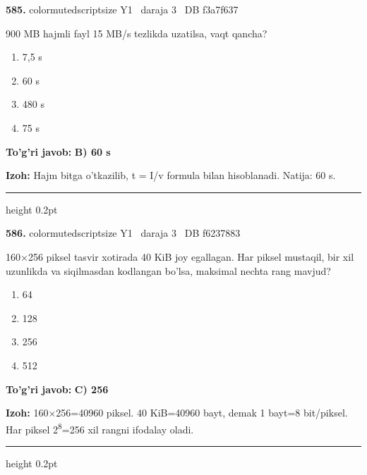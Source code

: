 \documentclass[10pt,a4paper,oneside]{article}
\begin{document}
\noindent\textbf{\color{ink}585.}  {color{muted}scriptsize Y1 \textbullet\ daraja 3 \textbullet\ DB f3a7f637}
\par
900 MB hajmli fayl 15 MB/s tezlikda uzatilsa, vaqt qancha?
\begin{enumerate}[label=\Alph*),leftmargin=9mm]
\item 7,5 s
\item 60 s
\item 480 s
\item 75 s
\end{enumerate}
\begin{tcolorbox}[enhanced,breakable,colback=teal!4,colframe=teal!50!black,boxrule=0.5pt,arc=1.1mm,left=3mm,right=3mm,top=1.7mm,bottom=1.7mm,before skip=2mm,after skip=2mm]
\textbf{\color{teal}To'g'ri javob:} \textbf{B) 60 s}
\par\smallskip
\textbf{Izoh:} Hajm bitga o'tkazilib, t = I/v formula bilan hisoblanadi. Natija: 60 s.
\end{tcolorbox}
\vspace{2mm}\hrule height 0.2pt \vspace{3mm}

\noindent\textbf{\color{ink}586.}  {color{muted}scriptsize Y1 \textbullet\ daraja 3 \textbullet\ DB f6237883}
\par
160\ensuremath{\times}256 piksel tasvir xotirada 40 KiB joy egallagan. Har piksel mustaqil, bir xil uzunlikda va siqilmasdan kodlangan bo'lsa, maksimal nechta rang mavjud?
\begin{enumerate}[label=\Alph*),leftmargin=9mm]
\item 64
\item 128
\item 256
\item 512
\end{enumerate}
\begin{tcolorbox}[enhanced,breakable,colback=teal!4,colframe=teal!50!black,boxrule=0.5pt,arc=1.1mm,left=3mm,right=3mm,top=1.7mm,bottom=1.7mm,before skip=2mm,after skip=2mm]
\textbf{\color{teal}To'g'ri javob:} \textbf{C) 256}
\par\smallskip
\textbf{Izoh:} 160\ensuremath{\times}256=40960 piksel. 40 KiB=40960 bayt, demak 1 bayt=8 bit/piksel. Har piksel 2\textsuperscript{8}=256 xil rangni ifodalay oladi.
\end{tcolorbox}
\vspace{2mm}\hrule height 0.2pt \vspace{3mm}
\end{document}
